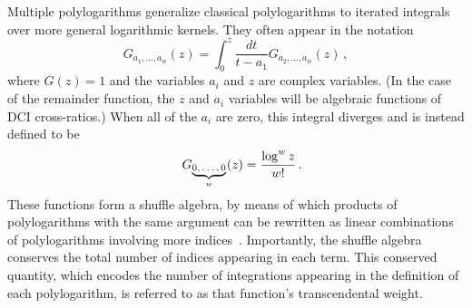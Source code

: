 \documentclass[11pt]{article}
\newcommand{\fwboxL}[2]{\text{\makebox[#1][l]{$#2$}}}
\begin{document}




Multiple polylogarithms generalize classical polylogarithms to iterated integrals over more general logarithmic kernels. They often appear in the notation
\begin{equation} \label{eq:G_notation}
G_{a_1,\dots, a_w}(z) = \int_0^z \frac{dt}{t-a_1} G_{a_2,\dots, a_w}(z)\, ,
\end{equation}
where $G(z) = 1$ and the variables $a_i$ and $z$ are complex variables. (In the case of the remainder function, the $z$ and $a_i$ variables will be algebraic functions of DCI cross-ratios.) When all of the $a_i$ are zero, this integral diverges and is instead defined to be
\begin{equation}
\quad G_{\fwboxL{27pt}{{\underbrace{0,\dots,0}_{w}}}}(z) = \frac{\log^w z}{w!} \, .
\end{equation}
These functions form a shuffle algebra, by means of which products of polylogarithms with the same argument can be rewritten as linear combinations of polylogarithms involving more indices~\cite{Ree:1958}. Importantly, the shuffle algebra conserves the total number of indices appearing in each term. This conserved quantity, which encodes the number of integrations appearing in the definition of each polylogarithm, is referred to as that function's transcendental weight. 
\end{document}
